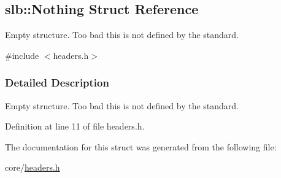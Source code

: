 \hypertarget{structslb_1_1Nothing}{}\subsection{slb\+:\+:Nothing Struct Reference}
\label{structslb_1_1Nothing}


Empty structure. Too bad this is not defined by the standard.  




{\ttfamily \#include $<$headers.\+h$>$}



\subsubsection{Detailed Description}
Empty structure. Too bad this is not defined by the standard. 

Definition at line 11 of file headers.\+h.



The documentation for this struct was generated from the following file\+:\begin{DoxyCompactItemize}
\item 
core/\hyperlink{core_2headers_8h}{headers.\+h}\end{DoxyCompactItemize}
